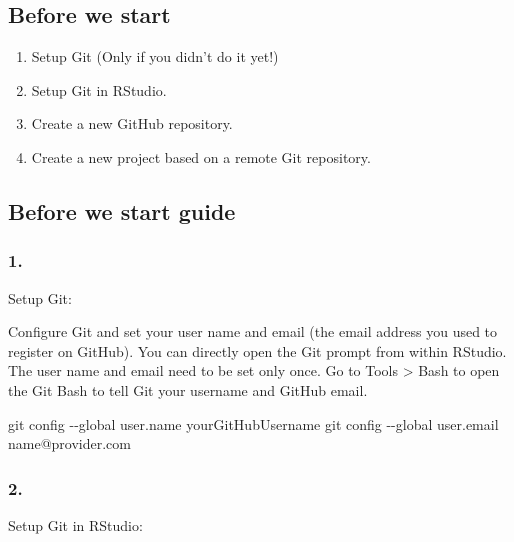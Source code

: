 \documentclass[
  letterpaper,
  DIV=11,
  numbers=noendperiod]{scrartcl}
\newenvironment{Shaded}{\begin{snugshade}}{\end{snugshade}}
\newcommand{\NormalTok}[1]{\textcolor[rgb]{0.00,0.46,0.62}{#1}}
\newcommand{\SpecialCharTok}[1]{\textcolor[rgb]{0.37,0.37,0.37}{#1}}
\newcommand{\StringTok}[1]{\textcolor[rgb]{0.13,0.47,0.30}{#1}}
\begin{document}
\hypertarget{before-we-start}{%
\subsection{Before we start}\label{before-we-start}}

\begin{enumerate}
\def\labelenumi{\arabic{enumi}.}
\item
  Setup Git (Only if you didn't do it yet!)
\item
  Setup Git in RStudio.
\item
  Create a new GitHub repository.
\item
  Create a new project based on a remote Git repository.
\end{enumerate}

\hypertarget{before-we-start-guide}{%
\subsection{Before we start guide}\label{before-we-start-guide}}

\hypertarget{section}{%
\subsubsection{1.}\label{section}}

Setup Git:

Configure Git and set your user name and email (the email address you
used to register on GitHub). You can directly open the Git prompt from
within RStudio. The user name and email need to be set only once. Go to
Tools \textgreater{} Bash to open the Git Bash to tell Git your username
and GitHub email.

\begin{Shaded}
\begin{Highlighting}[]
\NormalTok{git config }\SpecialCharTok{{-}{-}}\NormalTok{global user.name }\StringTok{\textquotesingle{}yourGitHubUsername\textquotesingle{}}
\NormalTok{git config }\SpecialCharTok{{-}{-}}\NormalTok{global user.email }\StringTok{\textquotesingle{}name@provider.com\textquotesingle{}}
\end{Highlighting}
\end{Shaded}

\hypertarget{section-1}{%
\subsubsection{2.}\label{section-1}}

Setup Git in RStudio:
\end{document}
